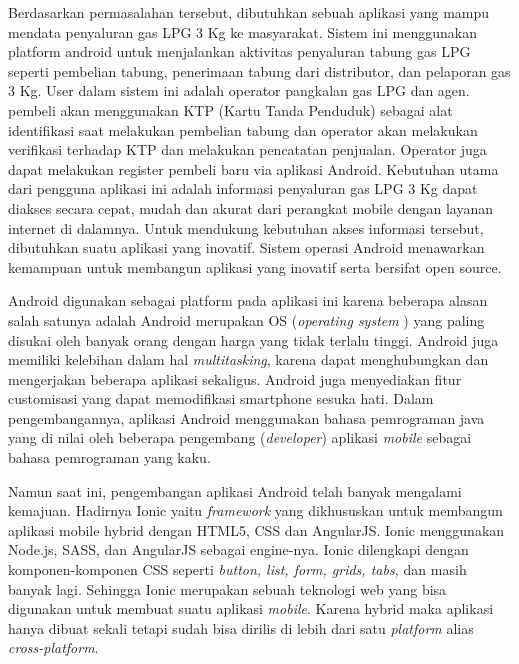 \par Berdasarkan permasalahan tersebut, dibutuhkan sebuah aplikasi yang mampu mendata penyaluran gas LPG 3 Kg ke masyarakat. Sistem ini menggunakan platform android untuk menjalankan aktivitas penyaluran tabung gas LPG seperti pembelian tabung, penerimaan tabung dari distributor, dan pelaporan gas 3 Kg. User dalam sistem ini adalah operator pangkalan gas LPG dan agen. pembeli akan menggunakan KTP (Kartu Tanda Penduduk) sebagai alat identifikasi saat melakukan pembelian tabung dan operator akan melakukan verifikasi terhadap KTP dan melakukan pencatatan penjualan. Operator juga dapat melakukan register pembeli baru via aplikasi Android. Kebutuhan utama dari pengguna aplikasi ini adalah informasi penyaluran gas LPG 3 Kg dapat diakses secara cepat, mudah dan akurat dari perangkat mobile dengan layanan internet di dalamnya. Untuk mendukung kebutuhan akses informasi tersebut, dibutuhkan suatu aplikasi yang inovatif. Sistem operasi Android menawarkan kemampuan untuk membangun aplikasi yang inovatif serta bersifat open source.
\par Android digunakan sebagai platform pada aplikasi ini karena beberapa alasan salah satunya adalah Android merupakan OS (\textit{operating system }) yang paling disukai oleh banyak orang dengan harga yang tidak terlalu tinggi. Android juga memiliki kelebihan dalam hal \textit{multitasking}, karena dapat menghubungkan dan mengerjakan beberapa aplikasi sekaligus. Android juga menyediakan fitur customisasi yang dapat memodifikasi smartphone sesuka hati. Dalam pengembangannya, aplikasi Android menggunakan bahasa pemrograman java yang di nilai oleh beberapa pengembang (\textit{developer}) aplikasi \textit{mobile} sebagai bahasa pemrograman yang kaku.
\par Namun saat ini, pengembangan aplikasi Android telah banyak mengalami kemajuan. Hadirnya Ionic yaitu \textit{framework} yang dikhususkan untuk membangun aplikasi mobile hybrid dengan HTML5, CSS dan AngularJS. Ionic menggunakan Node.js, SASS, dan AngularJS sebagai engine-nya. Ionic dilengkapi dengan komponen-komponen CSS seperti \textit{button, list, form, grids, tabs,} dan masih banyak lagi. Sehingga Ionic merupakan sebuah teknologi web yang bisa digunakan untuk membuat suatu aplikasi \textit{mobile}. Karena hybrid maka aplikasi hanya dibuat sekali tetapi sudah bisa dirilis di lebih dari satu \textit{platform} alias \textit{cross-platform}.
